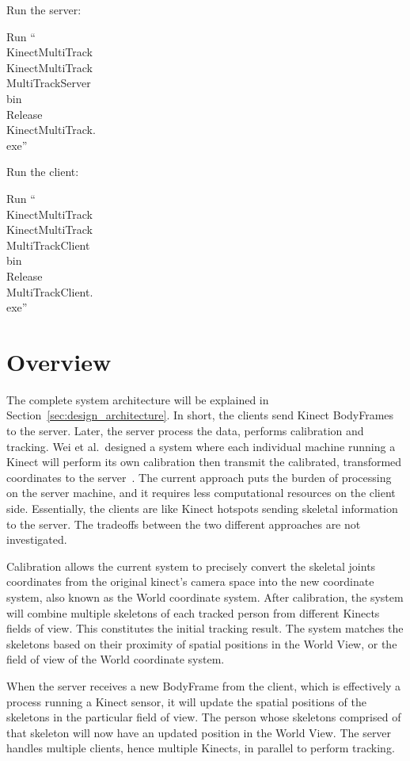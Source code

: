 Run the server:

{\centering
  Run ``\\KinectMultiTrack\\KinectMultiTrack\\MultiTrackServer\\bin\\Release\\KinectMultiTrack.\\exe''
}

Run the client:

{\centering
  Run ``\\KinectMultiTrack\\KinectMultiTrack\\MultiTrackClient\\bin\\Release\\MultiTrackClient.\\exe''
}

\section{Overview}
\label{sec:current_approach_overview}

The complete system architecture will be explained in Section~\ref{sec:design_architecture}. In short, the clients send Kinect BodyFrames to the server. Later, the server process the data, performs calibration and tracking. Wei et al.\ designed a system where each individual machine running a Kinect will perform its own calibration then transmit the calibrated, transformed coordinates to the server~\cite{wei_kinect_calibration}. The current approach puts the burden of processing on the server machine, and it requires less computational resources on the client side. Essentially, the clients are like Kinect hotspots sending skeletal information to the server. The tradeoffs between the two different approaches are not investigated.

Calibration allows the current system to precisely convert the skeletal joints coordinates from the original kinect's camera space into the new coordinate system, also known as the World coordinate system. After calibration, the system will combine multiple skeletons of each tracked person from different Kinects fields of view. This constitutes the initial tracking result. The system matches the skeletons based on their proximity of spatial positions in the World View, or the field of view of the World coordinate system.

When the server receives a new BodyFrame from the client, which is effectively a process running a Kinect sensor, it will update the spatial positions of the skeletons in the particular field of view. The person whose skeletons comprised of that skeleton will now have an updated position in the World View. The server handles multiple clients, hence multiple Kinects, in parallel to perform tracking.

